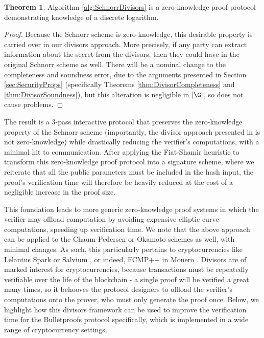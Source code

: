 \documentclass[11pt,letterpaper]{article}
\theoremstyle{definition}
\newtheorem{theorem}{Theorem}
\newcommand{\6}{\mathbf}
\newcommand{\7}{\mathcal}
\begin{document}
\begin{theorem}
    Algorithm \ref{alg:SchnorrDivisors} is a zero-knowledge proof protocol demonstrating knowledge of a discrete logarithm.
\end{theorem}
\begin{proof}
    Because the Schnorr scheme is zero-knowledge, this desirable property is carried over in our divisors approach. 
    More precisely, if any party can extract information about the secret from the divisors, then they could have in the original Schnorr scheme as well.
    There will be a nominal change to the completeness and soundness error, due to the arguments presented in Section \ref{sec:SecurityProps} (specifically Theorems \ref{thm:DivisorCompleteness} and \ref{thm:DivisorSoundness}), but this alteration is negligible in $|\G|$, so does not cause problems.
\end{proof}

The result is a $3$-pass interactive protocol that preserves the zero-knowledge property of the Schnorr scheme (importantly, the divisor approach presented in \cite{SoundnessForDLP} is not zero-knowledge) while drastically reducing the verifier's computations, with a minimal hit to communication.
After applying the Fiat-Shamir heuristic to transform this zero-knowledge proof protocol into a signature scheme, where we reiterate that all the public parameters must be included in the hash input, the proof's verification time will therefore be heavily reduced at the cost of a negligible increase in the proof size.



This foundation leads to more generic zero-knowledge proof systems in which the verifier may offload computation by avoiding expensive elliptic curve computations, speeding up verification time.
We note that the above approach can be applied to the Chaum-Pedersen \cite{ChaumPedersen} or Okamoto \cite{Okamoto} schemes as well, with minimal changes.
As such, this particularly pertains to cryptocurrencies like Lelantus Spark \cite{LelantusSpark} or Salvium \cite{Salvium}, or indeed, FCMP++ in Monero \cite{FCMP}.
Divisors are of marked interest for cryptocurrencies, because transactions must be repeatedly verifiable over the life of the blockchain - a single proof will be verified a great many times, so it behooves the protocol designers to offload the verifier's computations onto the prover, who must only generate the proof once.
Below, we highlight how this divisors framework can be used to improve the verification time for the Bulletproofs protocol \cite{Bullet} specifically, which is implemented in a wide range of cryptocurrency settings.
\end{document}
